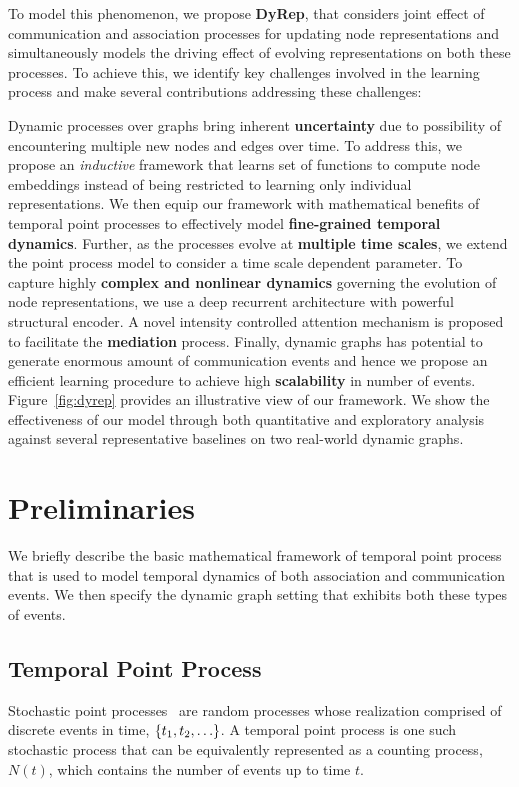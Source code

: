 \documentclass[11pt]{article}
\begin{document}
To model this phenomenon, we propose \textbf{DyRep}, that considers joint effect of communication and association processes for updating node representations and simultaneously models the driving effect of evolving representations on both these processes.   To achieve this, we identify key challenges involved in the learning process and make several contributions addressing these challenges:

Dynamic processes over graphs bring inherent \textbf{uncertainty} due to possibility of encountering multiple new nodes and edges over time. To address this, we propose an \emph{inductive} framework that learns set of functions to compute node embeddings instead of being restricted to learning only individual representations. We then equip our framework with mathematical benefits of temporal point processes to effectively model \textbf{fine-grained temporal dynamics}. Further, as the processes evolve at \textbf{multiple time scales}, we extend the point process model to consider a time scale dependent parameter.  To capture highly \textbf{complex and nonlinear dynamics} governing the evolution of node representations, we use a deep recurrent architecture with powerful structural encoder. A novel intensity controlled attention mechanism is proposed to facilitate the \textbf{mediation} process. Finally, dynamic graphs has potential to generate enormous amount of communication events and hence we propose an efficient learning procedure to achieve high \textbf{scalability} in number of events.
%
Figure~\ref{fig:dyrep} provides an illustrative view of our framework. We show the effectiveness of our model through both quantitative and exploratory analysis against several representative baselines on two real-world dynamic graphs.

\vspace{-2mm}
\section{Preliminaries}
We briefly describe the basic mathematical framework of temporal point process that is used to model temporal dynamics of both association and communication events. We then specify the dynamic graph setting that exhibits both these types of events.
\label{bkgrnd}
\vspace{-2mm}
\subsection{Temporal Point Process}
\vspace{-2mm}
Stochastic point processes~\cite{DalVer07} are random processes whose realization comprised of discrete events in time, $\left\{t_1, t_2, \ldots\right\}$. A temporal point process is one such stochastic process that can be equivalently re\-pre\-sen\-ted as a counting process, $N(t)$, which contains the number of events up to time $t$. 
%
\end{document}
